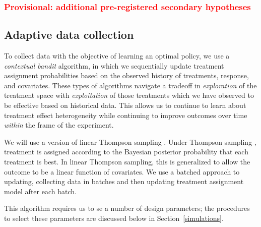 \documentclass[letterpaper, 12pt, parskip=full,]{scrartcl}
\begin{document}
\clearpage
\subsubsection{\textcolor{red}{Provisional: additional pre-registered secondary hypotheses}}


\subsection{Adaptive data collection}\label{adaptiveagent}

To collect data with the objective of learning an optimal policy, we use a \textit{contextual bandit} algorithm, in which we sequentially update treatment assignment probabilities based on the observed history of treatments, response, and covariates. These types of algorithms navigate a tradeoff in \textit{exploration} of the treatment space with \textit{exploitation} of those treatments which we have observed to be effective based on historical data. This allows us to continue to learn about treatment effect heterogeneity while continuing to improve outcomes over time \textit{within} the frame of the experiment. 

We will use a version of linear Thompson sampling \citep{agrawal2013thompson}. Under Thompson sampling \citep{thompson1933likelihood,thompson1935theory}, treatment is assigned according to the Bayesian posterior probability that each treatment is best. In linear Thompson sampling, this is generalized to allow the outcome to be a linear function of covariates. We use a batched approach to updating, collecting data in batches and then updating treatment assignment model after each batch. 

This algorithm requires us to se a number of design parameters; the procedures to select these parameters are discussed below in Section~\ref{simulations}. 
\end{document}
